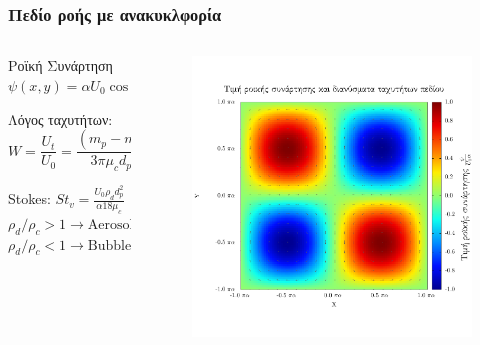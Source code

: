 \documentclass[12pt, hyperref={pdfpagelabels=false},aspectratio=169,fleqn, greek]{beamer}
\begin{document}
\begin{frame}
	\frametitle{Πεδίο ροής με ανακυκλφορία}
    \begin{columns}[T]
    	\begin{column}{0.4\textwidth}
			\begin{exampleblock}{Ροϊκή Συνάρτηση}
				\footnotesize
			\renewcommand\arraystretch{1.1}
			$ \psi(x,y) = \alpha U_0 \cos \left(\frac{x}{\alpha}+ \frac{\pi}{2}\right)\sin \left(\frac{y}{\alpha}\right)$
			\end{exampleblock}
			
			Λόγος ταχυτήτων:
			$$W = \frac{U_t}{U_0} = \frac{(m_p - m_f)g}{3 \pi \mu_c d_p U_0} $$

			Stokes: \quad $St_v = \frac{U_0 \rho_d d_p^2}{\alpha 18 \mu_c}$
			\vspace{0.2cm}\\
			\centering
			$\rho_d/\rho_c >1 \rightarrow \text{Aerosol}$
			$\rho_d/\rho_c <1 \rightarrow \text{Bubble}$
		\end{column}
	
    	\begin{column}{0.6\textwidth}
    		\vspace{-0.7cm}
    		\begin{figure}[ht]
    		\includegraphics[width = 1.0\textwidth, trim = 1cm 2.0cm 0 1.5cm , clip]{plots/roiki.pdf}
    		\end{figure}
		
   		\end{column}
   	\end{columns}
\end{frame}
\end{document}
